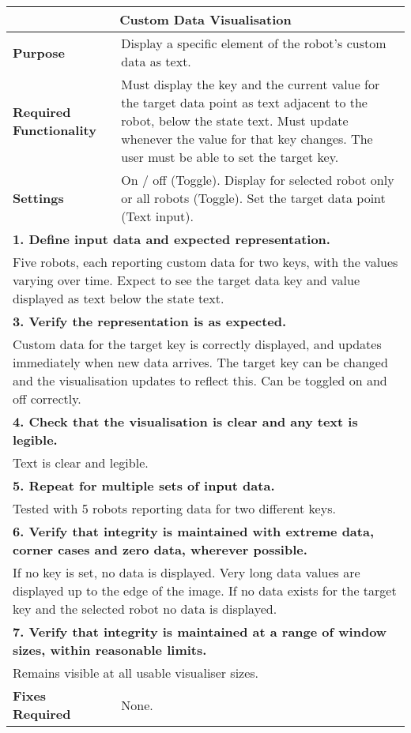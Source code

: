 \begin{longtable}{ l p{10cm} }
 \hline
 \multicolumn{2}{c}{\textbf{Custom Data Visualisation}}\\
 \hline
 \textbf{Purpose} & Display a specific element of the robot's custom data as text.\\
 \textbf{Required Functionality} & Must display the key and the current value for the target data point as text adjacent to the robot, below the state text. Must update whenever the value for that key changes. The user must be able to set the target key.\\
 \textbf{Settings} & On / off (Toggle). Display for selected robot only or all robots (Toggle). Set the target data point (Text input).\\
 \hline
 \multicolumn{2}{p{14cm}}{\textbf{1. Define input data and expected representation.}}\\
 \multicolumn{2}{p{14cm}}{Five robots, each reporting custom data for two keys, with the values varying over time. Expect to see the target data key and value displayed as text below the state text.}\\
 \hline
 \multicolumn{2}{p{14cm}}{\textbf{3. Verify the representation is as expected.}}\\
 \multicolumn{2}{p{14cm}}{Custom data for the target key is correctly displayed, and updates immediately when new data arrives. The target key can be changed and the visualisation updates to reflect this. Can be toggled on and off correctly.}\\
 \hline
 \multicolumn{2}{p{14cm}}{\textbf{4. Check that the visualisation is clear and any text is legible.}}\\
 \multicolumn{2}{p{14cm}}{Text is clear and legible.}\\
 \hline
 \multicolumn{2}{p{14cm}}{\textbf{5. Repeat for multiple sets of input data.}}\\
 \multicolumn{2}{p{14cm}}{Tested with 5 robots reporting data for two different keys.}\\
 \hline
 \multicolumn{2}{p{14cm}}{\textbf{6. Verify that integrity is maintained with extreme data, corner cases and zero data, wherever possible.}}\\
 \multicolumn{2}{p{14cm}}{If no key is set, no data is displayed. Very long data values are displayed up to the edge of the image. If no data exists for the target key and the selected robot no data is displayed.}\\
 \hline
 \multicolumn{2}{p{14cm}}{\textbf{7. Verify that integrity is maintained at a range of window sizes, within reasonable limits.}}\\
 \multicolumn{2}{p{14cm}}{Remains visible at all usable visualiser sizes.}\\
 \hline
 \textbf{Fixes Required} & None.\\
 \bottomrule
\end{longtable}
\clearpage